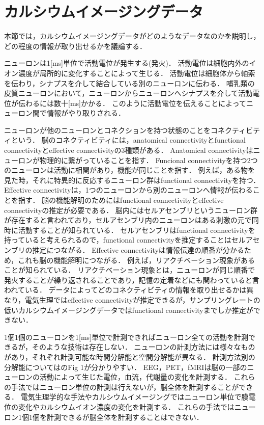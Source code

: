 \section{カルシウムイメージングデータ}
本節では，カルシウムイメージングデータがどのようなデータなのかを説明し，どの程度の情報が取り出せるかを議論する．

ニューロンは1[ms]単位で活動電位が発生する(発火)．
活動電位は細胞内外のイオン濃度が局所的に変化することによって生じる．
活動電位は細胞体から軸索を伝わり，シナプスを介して結合している別のニューロンに伝わる．
哺乳類の皮質ニューロンにおいて，ニューロンからニューロンへシナプスを介して活動電位が伝わるには数十[ms]かかる\cite{Izhikevich2004}．
このように活動電位を伝えることによってニューロン間で情報がやり取りされる．

ニューロンが他のニューロンとコネクションを持つ状態のことをコネクティビティという．
脳のコネクティビティには，anatomical connectivityとfunctional connectivityとeffective connectivityの3種類がある\cite{Sporns2007}．
Anatomical connectivityはニューロンが物理的に繋がっていることを指す．
Funcional connectivityを持つ2つのニューロンは活動に相関があり，機能が同じことを指す．
例えば，ある物を見た時，それに特異的に反応するニューロン群はfunctional connectivityを持つ．
Effective connectivityは，1つのニューロンから別のニューロンへ情報が伝わることを指す．
脳の機能解明のためにはfunctional connectivityとeffective connectivityの推定が必要である．
脳内にはセルアセンブリというニューロン群が存在すると言われており\cite{Harris2012}，セルアセンブリ内のニューロンはある刺激の元で同時に活動することが知られている．
セルアセンブリはfunctional connectivityを持っていると考えられるので，functional connectivityを推定することはセルアセンブリの推定につながる．
Effective connectivityは情報伝達の順番が分かるため，これも脳の機能解明につながる．
例えば，リアクチベーション現象があることが知られている．
リアクチベーション現象とは，ニューロンが同じ順番で発火することが繰り返されることであり，記憶の定着などにも関わっていると言われている．
データによってどのコネクティビティの情報を取り出せるかは異なり，電気生理ではeffective connectivityが推定できるが，サンプリングレートの低いカルシウムイメージングデータではfunctional connectivityまでしか推定ができない．

1個1個のニューロンを1[ms]単位で計測できればニューロン全ての活動を計測できるが，そのような技術は存在しない．
ニューロンの計測方法には様々なものがあり，それぞれ計測可能な時間分解能と空間分解能が異なる．
計測方法別の分解能については\cite{Sejnowski2014}のFig 1が分かりやすい．
EEG，PET，fMRIは脳の一部のニューロンの活動によって生じた電位，血流，代謝量の変化を計測する．
これらの手法ではニューロン単位の計測は行えないが，脳全体を計測することができる．
電気生理学的な手法やカルシウムイメージングではニューロン単位で膜電位の変化やカルシウムイオン濃度の変化を計測する．
これらの手法ではニューロン1個1個を計測できるが脳全体を計測することはできない．

